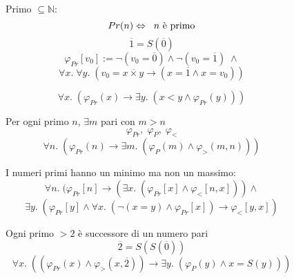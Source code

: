 \documentclass{article}
\theoremstyle{break}
\theoremstyle{break}
\theoremstyle{break}
\theoremstyle{break}
\begin{document}
  \begin{figure}[H]
    \begin{example}
      Primo \( \subseteq \mathbb{N} \):
      \[
        Pr(n) \Leftrightarrow \;\; \text{\( n \) è primo}
      \] 
      \[
        \overline{1} = S(\overline{0})
      \] 
      \[
        \varphi_{Pr}[v_0] := \neg(v_0 = \overline{0}) \wedge \neg(v_0 = \overline{1})\; \wedge
      \] 
      \[
        \forall x.\; \forall y.\; (v_0 = x \overline{\times} y \to (x=\overline{1} \wedge x = v_0))
      \] 
    \end{example}
  \end{figure}

  \begin{figure}[H]
    \begin{example}
      \[
        \forall x.\; (\varphi _{Pr}(x) \to \exists y.\; (x < y \wedge \varphi _{Pr}(y)))
      \] 
    \end{example}
  \end{figure}

  \begin{figure}[H]
    \begin{example}
      Per ogni primo \( n \), \( \exists m \) pari con \( m > n \) 
      \[
        \varphi_{Pr},\; \varphi_{P},\; \varphi_{<}
      \] 
      \[
        \forall n.\; (\varphi_{Pr}(n) \to \exists m.\; (\varphi_{P}(m) \wedge \varphi_{>}(m,n) ))
      \] 
    \end{example}
  \end{figure}

  \begin{figure}[H]
    \begin{example}
      I numeri primi hanno un minimo ma non un massimo:
      \[
        \forall n.\; (\varphi_{Pr}[n] \to (\exists x.\; (\varphi_{Pr}[x] \wedge \varphi_{<}[n,x])) \wedge
      \] 
      \[
        \exists y.\; (\varphi_{Pr}[y] \wedge \forall x.\; (\neg(x = y) \wedge \varphi_{Pr}[x]) \to \varphi_{<}[y,x])
      \] 
    \end{example}
  \end{figure}

  \begin{figure}[H]
    \begin{example}
      Ogni primo \( >2 \) è successore di un numero pari
      \[
        \overline{2} = S(S(\overline{0}))
      \] 
      \[
        \forall x.\; ((\varphi _{Pr}(x) \wedge \varphi_{>}(x, \overline{2})) \to \exists y.\; (\varphi_{P}(y) \wedge x = S(y)))
      \] 
    \end{example}
  \end{figure}
\end{document}
